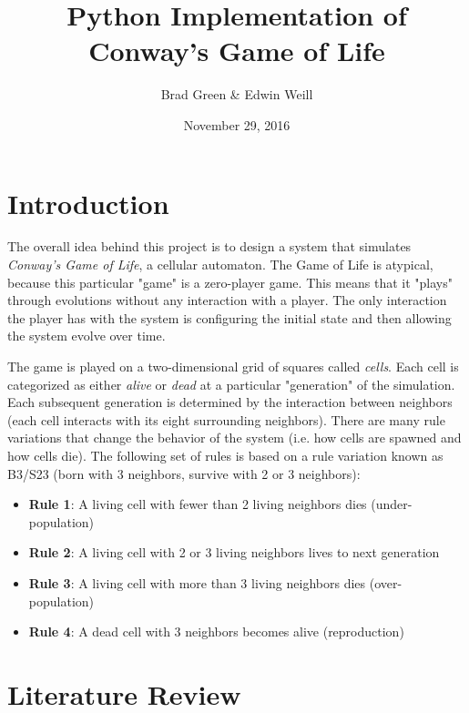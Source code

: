 \documentclass[11pt]{article}
\title{Python Implementation of Conway's Game of Life}
\author{Brad Green \& Edwin Weill}
\date{November 29, 2016}
\begin{document}
\maketitle

\section{Introduction}
The overall idea behind this project is to design a system that simulates \textit{Conway's Game of Life}, a cellular automaton.  The Game of Life is atypical, because this particular "game" is a zero-player game.  This means that it "plays" through evolutions without any interaction with a player.  The only interaction the player has with the system is configuring the initial state and then allowing the system evolve over time.
\par
The game is played on a two-dimensional grid of squares called \textit{cells}.  Each cell is categorized as either \textit{alive} or \textit{dead} at a particular "generation" of the simulation.  Each subsequent generation is determined by the interaction between neighbors (each cell interacts with its eight surrounding neighbors).  There are many rule variations that change the behavior of the system (i.e. how cells are spawned and how cells die).  The following set of rules is based on a rule variation known as B3/S23 (born with 3 neighbors, survive with 2 or 3 neighbors):
\begin{itemize}
	\item \textbf{Rule 1}: A living cell with fewer than 2 living neighbors dies (under-population)
	\item \textbf{Rule 2}: A living cell with 2 or 3 living neighbors lives to next generation
	\item \textbf{Rule 3}: A living cell with more than 3 living neighbors dies (over-population)
	\item \textbf{Rule 4}: A dead cell with 3 neighbors becomes alive (reproduction)
\end{itemize}

\section{Literature Review}
\end{document}
